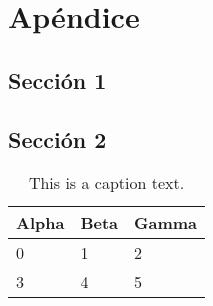 \chapter{Apéndice}

\section{Sección 1}

{
\color{gray}
\Blindtext[1][1]
}


\section{Sección 2}
\label{sec:appendix:sec2}


{
\color{gray}
\Blindtext[1][1]

\begin{table}[h]
	\begin{tabularx}{\textwidth}{X | X | X}
		Alpha		& Beta			& Gamma			\\ \hline
		0			& 1				& 2				\\ \hline
		3			& 4				& 5				\\ %
	\end{tabularx}
	\label{tab:table2}
	\caption{This is a caption text.}
\end{table}


\Blindtext[1][2]
}